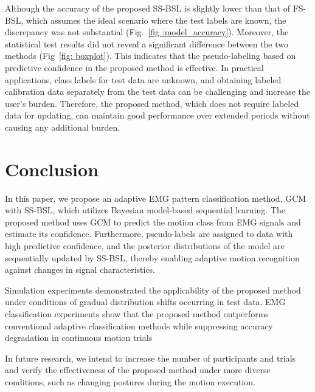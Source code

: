\documentclass[letterpaper, 10 pt, conference]{ieeeconf}
\begin{document}
Although the accuracy of the proposed SS-BSL is slightly lower than that of FS-BSL, which assumes the ideal scenario where the test labels are known, the discrepancy was not substantial (Fig.~\ref{fig :model_accuracy}). 
Moreover, the statistical test results did not reveal a significant difference between the two methods (Fig~\ref{fig: boxplot}). 
This indicates that the pseudo-labeling based on predictive confidence in the proposed method is effective. 
In practical applications, class labels for test data are unknown, and obtaining labeled calibration data separately from the test data can be challenging and increase the user's burden. 
Therefore, the proposed method, which does not require labeled data for updating, can maintain good performance over extended periods without causing any additional burden.


\section{Conclusion}
In this paper, we propose an adaptive EMG pattern classification method, GCM with SS-BSL, which utilizes Bayesian model-based sequential learning. 
The proposed method uses GCM to predict the motion class from EMG signals and estimate its confidence. 
Furthermore, pseudo-labels are assigned to data with high predictive confidence, and the posterior distributions of the model are sequentially updated by SS-BSL, thereby enabling adaptive motion recognition against changes in signal characteristics.

Simulation experiments demonstrated the applicability of the proposed method under conditions of gradual distribution shifts occurring in test data. 
EMG  classification experiments show that the proposed method outperforms conventional adaptive classification methods while suppressing accuracy degradation in continuous motion trials

In future research, we intend to increase the number of participants and trials and verify the effectiveness of the proposed method under more diverse conditions, such as changing postures during the motion execution.

\end{document}
